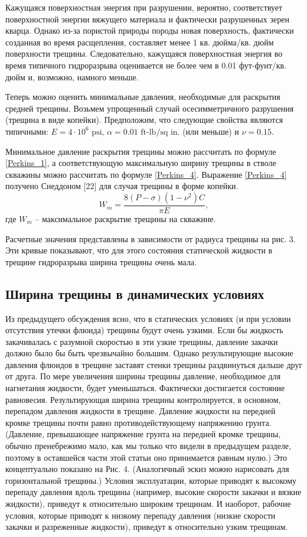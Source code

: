 \documentclass[a4paper, 12pt]{article}
\newcommand{\beq}{\begin{equation}}
\newcommand{\eeq}{\end{equation}}
\begin{document}
Кажущаяся поверхностная энергия при разрушении, вероятно, соответствует поверхностной энергии вяжущего материала и фактически разрушенных зерен кварца.
Однако из-за пористой природы породы новая поверхность, фактически созданная во время расщепления, составляет менее 1 кв. дюйма/кв. дюйм поверхности трещины.
Следовательно, кажущаяся поверхностная энергия во время типичного гидроразрыва оценивается не более чем в 0.01 фут-фунт/кв. дюйм и, возможно, намного меньше.

Теперь можно оценить минимальные давления, необходимые для раскрытия средней трещины.
Возьмем упрощенный случай осесимметричного разрушения (трещина в виде копейки).
Предположим, что следующие свойства являются типичными: $E=4\cdot10^6\text{ psi}$, $\alpha=0.01\text{ ft-lb/sq in.}$ (или меньше) и $\nu=0.15$.

Минимальное давление раскрытия трещины можно рассчитать по формуле \eqref{Perkins_1}, а соответствующую максимальную ширину трещины в стволе скважины можно рассчитать по формуле \eqref{Perkins_4}.
Выражение \eqref{Perkins_4} получено Снеддоном [22] для случая трещины в форме копейки.
\beq\label{Perkins_4}
W_m=\frac{8\left(P-\sigma\right)\left(1-\nu^2\right)C}{\pi E},
\tag{4}
\eeq
где $W_m$ -- максимальное раскрытие трещины на скважине.

Расчетные значения представлены в зависимости от радиуса трещины на рис. 3.
Эти кривые показывают, что для этого состояния статической жидкости в трещине гидроразрыва ширина трещины очень мала.

\subsection{Ширина трещины в динамических условиях}

Из предыдущего обсуждения ясно, что в статических условиях (и при условии отсутствия утечки флюида) трещины будут очень узкими.
Если бы жидкость закачивалась с разумной скоростью в эти узкие трещины, давление закачки должно было бы быть чрезвычайно большим.
Однако результирующие высокие давления флюидов в трещине заставят стенки трещины раздвинуться дальше друг от друга.
По мере увеличения ширины трещины давление, необходимое для нагнетания жидкости, будет уменьшаться.
Фактически достигается состояние равновесия.
Результирующая ширина трещины контролируется, в основном, перепадом давления жидкости в трещине.
Давление жидкости на передней кромке трещины почти равно противодействующему напряжению грунта. (Давление, превышающее напряжение грунта на передней кромке трещины, обычно пренебрежимо мало, как мы только что видели в предыдущем разделе, поэтому в оставшейся части этой статьи оно принимается равным нулю.)
Это концептуально показано на Рис. 4. (Аналогичный эскиз можно нарисовать для горизонтальной трещины.)
Условия эксплуатации, которые приводят к высокому перепаду давления вдоль трещины (например, высокие скорости закачки и вязкие жидкости), приведут к относительно широким трещинам.
И наоборот, рабочие условия, которые приводят к низкому перепаду давления (низкие скорости закачки и разреженные жидкости), приведут к относительно узким трещинам.
\end{document}
